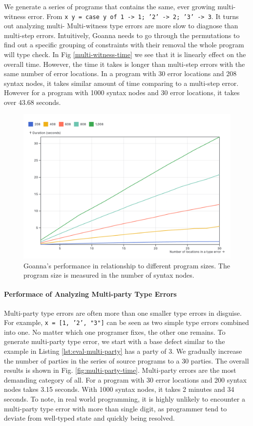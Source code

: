 \documentclass[pdflatex,sn-mathphys-num]{sn-jnl}%
\begin{document}
    We generate a series of programs that contains the same, ever growing multi-witness error. From \texttt{x y = case y of 1 -> 1; '2' -> 2; '3' -> 3}. 
    It turns out analyzing multi-
    Multi-witness type errors are more slow to diagnose than multi-step errors. Intuitively, Goanna needs to go through the permutations to find out a specific grouping of constraints with their removal the whole program will type check. In Fig \ref{multi-witness-time} we see that it is linearly effect on the overall time. However, the time it takes is longer than multi-step errors with the same number of error locations. In a program with 30 error locations and 208 syntax nodes, it takes similar amount of time comparing to a multi-step error. However for a program with 1000 syntax nodes and 30 error locations, it takes over 43.68 seconds. 
 \begin{figure}[ht]
        \centering
        \includegraphics[width=0.8\linewidth]{images/multi-witness-time.png}
        \caption{Goanna's performance in relationship to different program sizes. The program size is measured in the number of syntax nodes.}
        \label{fig:multi-witness-time}
    \end{figure}
  
   \paragraph{\textbf{Performace of Analyzing Multi-party Type Errors}}
    Multi-party type errors are often more than one smaller type errors in disguise. For example, \texttt{x = [1, '2', "3"]} can be seen as two simple type errors combined into one. No matter which one programer fixes, the other one remains. To generate multi-party type error, we start with a base defect similar to the example in Listing \ref{lst:eval-multi-party} has a party of 3. We gradually increase the number of parties in the series of source programs to a 30 parties. The overall results is shown in Fig. \ref{fig:multi-party-time}. Multi-party errors are the most demanding category of all. For a program with 30 error locations and 200 syntax nodes takes 3.15 seconds. With 1000 syntax nodes, it takes 2 minutes and 34 seconds. To note, in real world programming, it is highly unlikely to encounter a multi-party type error with more than single digit, as programmer tend to deviate from well-typed state and quickly being resolved. 
\end{document}
